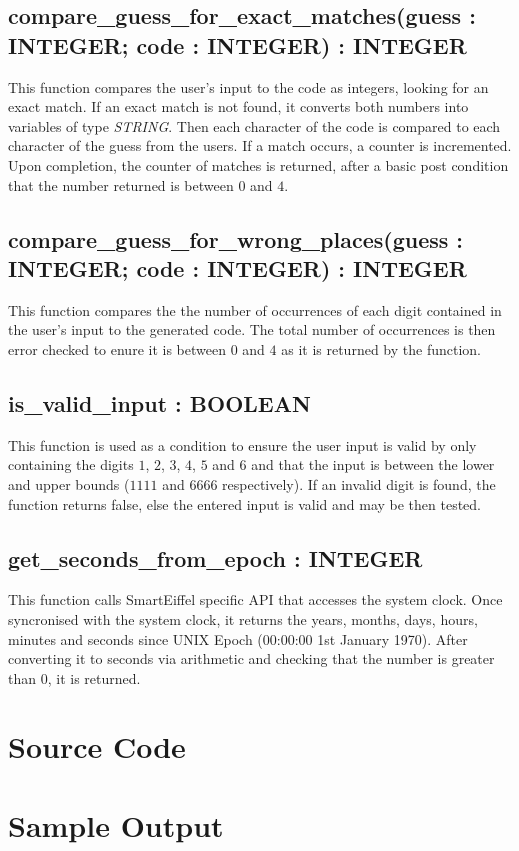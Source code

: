\documentclass[a4paper,12pt]{article}
\begin{document}
\subsection{compare\_guess\_for\_exact\_matches(guess : INTEGER; code :
INTEGER) : INTEGER}

This function compares the user's input to the code as integers, looking
for an exact match. If an exact match is not found, it converts both
numbers into variables of type \emph{STRING}. Then each character of the
code is compared to each character of the guess from the users. If a
match occurs, a counter is incremented. Upon completion, the counter of
matches is returned, after a basic post condition that the number
returned is between $0$ and $4$.

\subsection{compare\_guess\_for\_wrong\_places(guess : INTEGER; code :
INTEGER) : INTEGER}

This function compares the the number of occurrences of each digit
contained in the user's input to the generated code. The total number of
occurrences is then error checked to enure it is between $0$ and $4$ as
it is returned by the function.

\subsection{is\_valid\_input : BOOLEAN}

This function is used as a condition to ensure the user input is valid
by only containing the digits $1$, $2$, $3$, $4$, $5$ and $6$ and that
the input is between the lower and upper bounds ($1111$ and $6666$
respectively). If an invalid digit is found, the function returns false,
else the entered input is valid and may be then tested.

\subsection{get\_seconds\_from\_epoch : INTEGER}

This function calls SmartEiffel specific API that accesses the system
clock. Once syncronised with the system clock, it returns the years,
months, days, hours, minutes and seconds since UNIX Epoch (00:00:00 1st
January 1970). After converting it to seconds via arithmetic and
checking that the number is greater than $0$, it is returned.

\pagebreak

\section{Source Code}

\pagebreak

\section{Sample Output}
\end{document}
